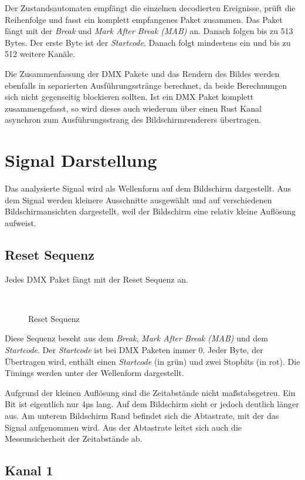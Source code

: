 Der Zustandsautomaten empfängt die einzelnen decodierten Ereignisse, prüft die Reihenfolge und fasst ein komplett empfangenes Paket zusammen. Das Paket fängt mit der \emph{Break} und \emph{Mark After Break (MAB)} an. Danach folgen bis zu 513 Bytes. Der erste Byte ist der \emph{Startcode}. Danach folgt mindestens ein und bis zu 512 weitere Kanäle.

Die Zusammenfassung der DMX Pakete und das Rendern des Bildes werden ebenfalls in separierten Ausführungsstränge berechnet, da beide Berechnungen sich nicht gegenseitig blockieren sollten. Ist ein DMX Paket komplett zusammengefasst, so wird dieses auch wiederum über einen Rust Kanal asynchron zum Ausführungsstrang des Bildschirmrenderers übertragen.  

\section{Signal Darstellung}
Das analysierte Signal wird als Wellenform auf dem Bildschirm dargestellt.
Aus dem Signal werden kleinere Ausschnitte ausgewählt und auf verschiedenen Bildschirmansichten dargestellt, weil der Bildschirm eine relativ kleine Auflösung aufweist.

\subsection{Reset Sequenz}
Jedes DMX Paket fängt mit der Reset Sequenz an.

\begin{figure}[H]
	\centering
	\\
	\caption{Reset Sequenz}
\end{figure}
Diese Sequenz beseht aus dem \emph{Break}, \emph{Mark After Break (MAB)} und dem \emph{Startcode}. Der \emph{Startcode} ist bei DMX Paketen immer 0. Jeder Byte, der Übertragen wird, enthält einen \emph{Startcode} (in grün) und zwei Stopbits (in rot). Die Timings werden unter der Wellenform dargestellt.

Aufgrund der kleinen Auflösung sind die Zeitabstände nicht maßstabsgetreu. Ein Bit ist eigentlich nur 4µs lang. Auf dem Bildschirm sieht er jedoch deutlich länger aus. Am unterem Bildschirm Rand befindet sich die Abtastrate, mit der das Signal aufgenommen wird. Aus der Abtastrate leitet sich auch die Messunsicherheit der Zeitabstände ab.

\subsection{Kanal 1}

